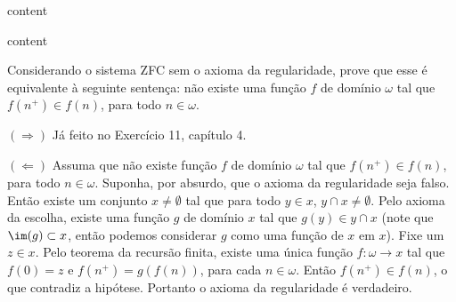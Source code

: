 \begin{exercicio}
	content
\end{exercicio}
\begin{solucao}
	content
\end{solucao}

\begin{exercicio}
	Considerando o sistema ZFC sem o axioma da regularidade, prove que esse é equivalente à seguinte sentença: não existe uma função $f$ de domínio $\omega$ tal que $f(n^+)\in f(n)$, para todo $n\in\omega$.
\end{exercicio}
\begin{solucao}
	$(\Rightarrow)$ Já feito no Exercício 11, capítulo 4.
	
	$(\Leftarrow)$ Assuma que não existe função $f$ de domínio $\omega$ tal que $f(n^+)\in f(n)$, para todo $n\in\omega$. Suponha, por absurdo, que o axioma da regularidade seja falso. Então existe um conjunto $x\neq\emptyset$ tal que para todo $y\in x$, $y\cap x\neq\emptyset$. Pelo axioma da escolha, existe uma função $g$ de domínio $x$ tal que $g(y)\in y\cap x$ (note que $\im(g)\subset x$, então podemos considerar $g$ como uma função de $x$ em $x$). Fixe um $z\in x$. Pelo teorema da recursão finita, existe uma única função $f:\omega\to x$ tal que $f(0)=z$ e $f(n^+)=g(f(n))$, para cada $n\in\omega$. Então $f(n^+)\in f(n)$, o que contradiz a hipótese. Portanto o axioma da regularidade é verdadeiro.
\end{solucao}